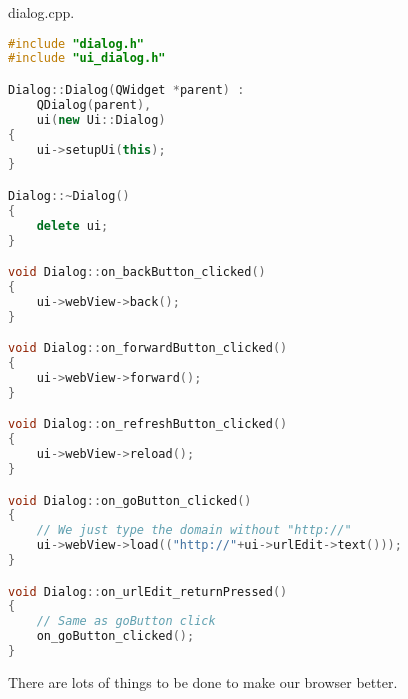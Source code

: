 dialog.cpp.

\begin{lstlisting}[language=c++, numbers=none]
#include "dialog.h"
#include "ui_dialog.h"

Dialog::Dialog(QWidget *parent) :
    QDialog(parent),
    ui(new Ui::Dialog)
{
    ui->setupUi(this);
}

Dialog::~Dialog()
{
    delete ui;
}

void Dialog::on_backButton_clicked()
{
    ui->webView->back();
}

void Dialog::on_forwardButton_clicked()
{
    ui->webView->forward();
}

void Dialog::on_refreshButton_clicked()
{
    ui->webView->reload();
}

void Dialog::on_goButton_clicked()
{
    // We just type the domain without "http://"
    ui->webView->load(("http://"+ui->urlEdit->text()));
}

void Dialog::on_urlEdit_returnPressed()
{
    // Same as goButton click
    on_goButton_clicked();
}
\end{lstlisting}

There are lots of things to be done to make our browser better.
